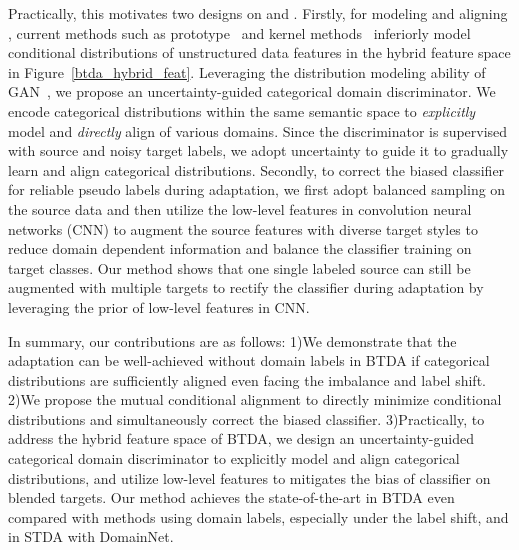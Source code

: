 \documentclass[letterpaper]{article} \usepackage{aaai23}  \usepackage{times}  \usepackage{helvet}  \usepackage{courier}  \usepackage[hyphens]{url}  \usepackage{graphicx} \urlstyle{rm} \def\UrlFont{\rm}  \usepackage{natbib}  \usepackage{caption} \frenchspacing  \setlength{\pdfpagewidth}{8.5in}  \setlength{\pdfpageheight}{11in}
\begin{document}
Practically, this motivates two designs on  and . Firstly, for modeling and aligning , current methods such as prototype~\cite{pan2019transferrable,tanwisuth2021prototype} and kernel methods~\cite{wang2020rethink} inferiorly model conditional distributions of unstructured data features in the hybrid feature space  in Figure~\ref{btda_hybrid_feat}. Leveraging the distribution modeling ability of GAN~\cite{arora2017generalization,goodfellow2014generative}, we propose an uncertainty-guided categorical domain discriminator. We encode categorical distributions within the same semantic space to \textit{explicitly} model and \textit{directly} align  of various domains. Since the discriminator is supervised with source and noisy target labels, we adopt uncertainty to guide it to gradually learn and align categorical distributions. Secondly, to correct the biased classifier for reliable pseudo labels during adaptation, we first adopt balanced sampling on the source data and then utilize the low-level features in convolution neural networks (CNN) to augment the source features with diverse target styles to
reduce domain dependent information and balance the classifier training on target classes. Our method shows that one single labeled source can still be augmented with multiple targets to rectify the classifier during adaptation by leveraging the prior of low-level features in CNN.


In summary, our contributions are as follows: 1)We demonstrate that the adaptation can be well-achieved without domain labels in BTDA if categorical distributions are sufficiently aligned even facing the imbalance and label shift.
2)We propose the mutual conditional alignment to directly minimize conditional distributions and simultaneously correct the biased classifier.
3)Practically, to address the hybrid feature space of BTDA, we design an uncertainty-guided categorical domain discriminator to explicitly model and align categorical distributions, and utilize low-level features to mitigates the bias of classifier on blended targets.
Our method achieves the state-of-the-art in BTDA even compared with methods using domain labels, especially under the label shift, and in STDA with DomainNet.
\end{document}
